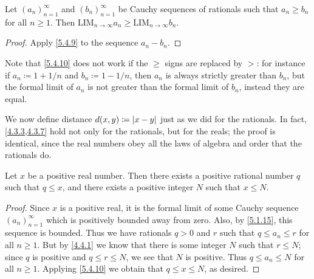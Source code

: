 \begin{cor}\label{5.4.10}
  Let \((a_n)_{n = 1}^{\infty}\) and \((b_n)_{n = 1}^{\infty}\) be Cauchy sequences of rationals such that \(a_n \geq b_n\) for all \(n \geq 1\).
  Then \(\text{LIM}_{n \to \infty} a_n \geq \text{LIM}_{n \to \infty} b_n\).
\end{cor}

\begin{proof}
  Apply \cref{5.4.9} to the sequence \(a_n - b_n\).
\end{proof}

\begin{rmk}\label{5.4.11}
  Note that \cref{5.4.10} does not work if the \(\geq\) signs are replaced by \(>\):
  for instance if \(a_n \coloneqq 1 + 1 / n\) and \(b_n \coloneqq 1 - 1 / n\), then \(a_n\) is always strictly greater than \(b_n\), but the formal limit of \(a_n\) is not greater than the formal limit of \(b_n\), instead they are equal.
\end{rmk}

\begin{note}
  We now define distance \(d(x, y) \coloneqq \left\lvert x - y\right\rvert\) just as we did for the rationals.
  In fact, \cref{4.3.3,4.3.7} hold not only for the rationals, but for the reals;
  the proof is identical, since the real numbers obey all the laws of algebra and order that the rationals do.
\end{note}

\begin{prop}\label{5.4.12}
  Let \(x\) be a positive real number.
  Then there exists a positive rational number \(q\) such that \(q \leq x\), and there exists a positive integer \(N\) such that \(x \leq N\).
\end{prop}

\begin{proof}
  Since \(x\) is a positive real, it is the formal limit of some Cauchy sequence \((a_n)_{n = 1}^{\infty}\) which is positively bounded away from zero.
  Also, by \cref{5.1.15}, this sequence is bounded.
  Thus we have rationals \(q > 0\) and \(r\) such that \(q \leq a_n \leq r\) for all \(n \geq 1\).
  But by \cref{4.4.1} we know that there is some integer \(N\) such that \(r \leq N\);
  since \(q\) is positive and \(q \leq r \leq N\), we see that \(N\) is positive.
  Thus \(q \leq a_n \leq N\) for all \(n \geq 1\).
  Applying \cref{5.4.10} we obtain that \(q \leq x \leq N\), as desired.
\end{proof}

